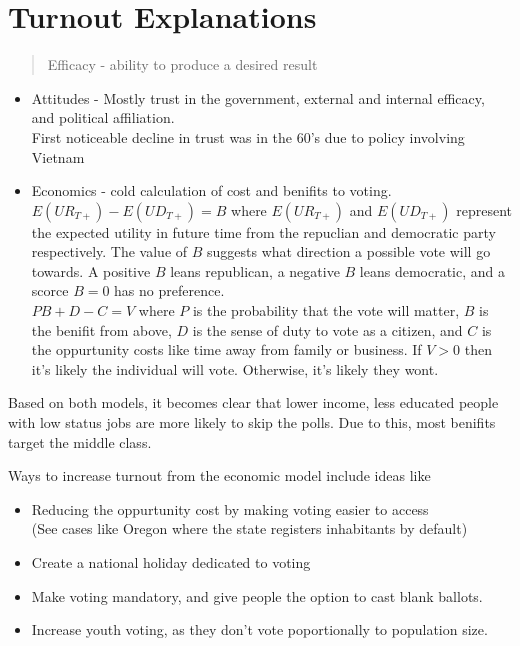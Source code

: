 \documentclass{article}
\begin{document}
\section{Turnout Explanations}
\begin{quote}
  Efficacy - ability to produce a desired result
\end{quote}
\begin{itemize}
  \item Attitudes - Mostly trust in the government, external and internal efficacy, and political affiliation.\\
  First noticeable decline in trust was in the 60's due to policy involving Vietnam\\
  \item Economics - cold calculation of cost and benifits to voting. \\
  $E(UR_{T+}) - E(UD_{T+}) = B$ where $E(UR_{T+})$ and $E(UD_{T+})$ represent the expected utility in future time from the repuclian and democratic party respectively. The value of $B$ suggests what direction a possible vote will go towards. A positive $B$ leans republican, a negative $B$ leans democratic, and a scorce $B=0$ has no preference.\\
  $PB+D-C = V$ where $P$ is the probability that the vote will matter, $B$ is the benifit from above, $D$ is the sense of duty to vote as a citizen, and $C$ is the oppurtunity costs like time away from family or business. If $V > 0$ then it's likely the individual will vote. Otherwise, it's likely they wont.
\end{itemize}

Based on both models, it becomes clear that lower income, less educated people with low status jobs are more likely to skip the polls. Due to this, most benifits target the middle class.

Ways to increase turnout from the economic model include ideas like
\begin{itemize}
  \item Reducing the oppurtunity cost by making voting easier to access\\
  (See cases like Oregon where the state registers inhabitants by default)
  \item Create a national holiday dedicated to voting
  \item Make voting mandatory, and give people the option to cast blank ballots.
  \item Increase youth voting, as they don't vote poportionally to population size.
\end{itemize}
\end{document}
